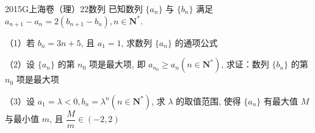 
\begin{problem}{2015}{G}{上海卷（理）}{22}{数列}
已知数列 $\{a_n\}$ 与 $\{b_n\}$ 满足 $a_{n+1}-a_n=2(b_{n+1}-b_n), n \in \mathbf{N}^*$.

（1）若 $b_n=3n+5$, 且 $a_1=1$, 求数列 $\{a_n\}$ 的通项公式

（2）设 $\{a_n\}$ 的第 $n_0$ 项是最大项, 即 $a_{n_0} \ge a_n (n \in \mathbf{N}^*)$, 求证：数列 $\{b_n\}$ 的第 $n_0$ 项是最大项

（3）设 $a_1=\lambda<0, b_n=\lambda^n (n \in \mathbf{N}^*)$, 求 $\lambda$ 的取值范围, 使得 $\{a_n\}$ 有最大值 $M$ 与最小值 $m$, 且 $\dfrac{M}{m} \in (-2, 2)$
\end{problem}